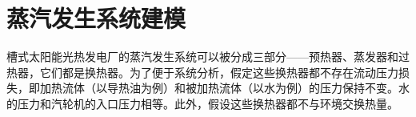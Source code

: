 %
%
%
%
%
%
%
%

\section{蒸汽发生系统建模}
槽式太阳能光热发电厂的蒸汽发生系统可以被分成三部分——预热器、蒸发器和过热器，它们都是换热器。为了便于系统分析，假定这些换热器都不存在流动压力损失，即加热流体（以导热油为例）和被加热流体（以水为例）的压力保持不变。水的压力和汽轮机的入口压力相等。此外，假设这些换热器都不与环境交换热量。

